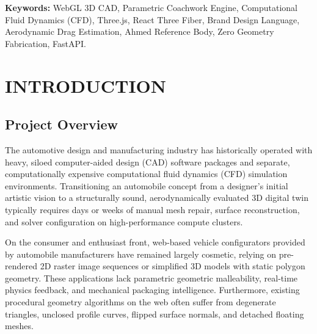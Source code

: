 \documentclass[12pt,a4paper]{report}
\begin{document}
\vspace{0.4cm}
\noindent\textbf{Keywords:} WebGL 3D CAD, Parametric Coachwork Engine, Computational Fluid Dynamics (CFD), Three.js, React Three Fiber, Brand Design Language, Aerodynamic Drag Estimation, Ahmed Reference Body, Zero Geometry Fabrication, FastAPI.
\newpage

\tableofcontents
\newpage
\listoffigures
\vspace{0.8cm}
\begingroup
\let\clearpage\relax
\let\cleardoublepage\relax
\listoftables
\endgroup
\newpage

\setcounter{page}{1}

\chapter{INTRODUCTION}

\section{Project Overview}
The automotive design and manufacturing industry has historically operated with heavy, siloed computer-aided design (CAD) software packages and separate, computationally expensive computational fluid dynamics (CFD) simulation environments. Transitioning an automobile concept from a designer's initial artistic vision to a structurally sound, aerodynamically evaluated 3D digital twin typically requires days or weeks of manual mesh repair, surface reconstruction, and solver configuration on high-performance compute clusters.

On the consumer and enthusiast front, web-based vehicle configurators provided by automobile manufacturers have remained largely cosmetic, relying on pre-rendered 2D raster image sequences or simplified 3D models with static polygon geometry. These applications lack parametric geometric malleability, real-time physics feedback, and mechanical packaging intelligence. Furthermore, existing procedural geometry algorithms on the web often suffer from degenerate triangles, unclosed profile curves, flipped surface normals, and detached floating meshes.
\end{document}
